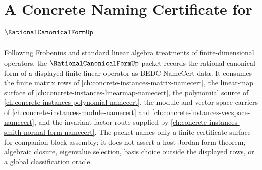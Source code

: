 \chapter{A Concrete Naming Certificate for $\RationalCanonicalFormUp$}
\label{ch:concrete-instances-rational-canonical-form-namecert}

Following Frobenius and standard linear algebra treatments of finite-dimensional operators, the $\RationalCanonicalFormUp$ packet records the rational canonical form of a displayed finite linear operator as BEDC NameCert data. It consumes the finite matrix rows of \autoref{ch:concrete-instances-matrix-namecert}, the linear-map surface of \autoref{ch:concrete-instances-linearmap-namecert}, the polynomial source of \autoref{ch:concrete-instances-polynomial-namecert}, the module and vector-space carriers of \autoref{ch:concrete-instances-module-namecert} and \autoref{ch:concrete-instances-vecspace-namecert}, and the invariant-factor route supplied by \autoref{ch:concrete-instances-smith-normal-form-namecert}. The packet names only a finite certificate surface for companion-block assembly; it does not assert a host Jordan form theorem, algebraic closure, eigenvalue selection, basis choice outside the displayed rows, or a global classification oracle.

